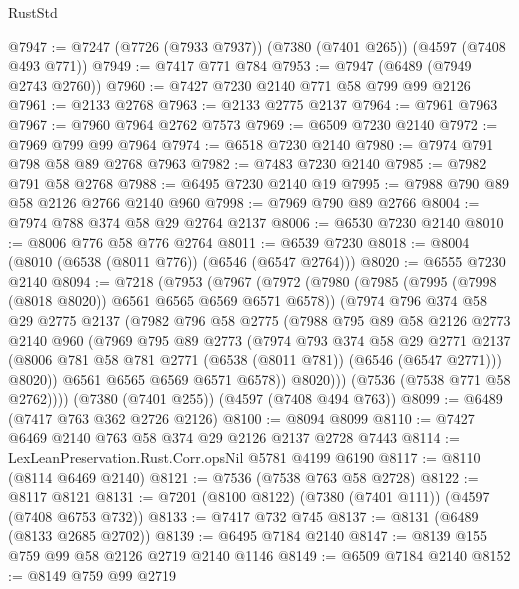 \begin{lexlean}{RustStd}
\begin{coremodule}
@7947 := @7247 (@7726 (@7933 @7937)) (@7380 (@7401 @265)) (@4597 (@7408 @493 @771))
@7949 := @7417 @771 @784
@7953 := @7947 (@6489 (@7949 @2743 @2760))
@7960 := @7427 @7230 @2140 @771 @58 @799 @99 @2126
@7961 := @2133 @2768
@7963 := @2133 @2775 @2137
@7964 := @7961 @7963
@7967 := @7960 @7964 @2762 @7573
@7969 := @6509 @7230 @2140
@7972 := @7969 @799 @99 @7964
@7974 := @6518 @7230 @2140
@7980 := @7974 @791 @798 @58 @89 @2768 @7963
@7982 := @7483 @7230 @2140
@7985 := @7982 @791 @58 @2768
@7988 := @6495 @7230 @2140 @19
@7995 := @7988 @790 @89 @58 @2126 @2766 @2140 @960
@7998 := @7969 @790 @89 @2766
@8004 := @7974 @788 @374 @58 @29 @2764 @2137
@8006 := @6530 @7230 @2140
@8010 := @8006 @776 @58 @776 @2764
@8011 := @6539 @7230
@8018 := @8004 (@8010 (@6538 (@8011 @776)) (@6546 (@6547 @2764)))
@8020 := @6555 @7230 @2140
@8094 := @7218
    (@7953
      (@7967
        (@7972
          (@7980
            (@7985 (@7995 (@7998 (@8018 @8020)) @6561 @6565 @6569 @6571 @6578))
            (@7974
              @796
              @374
              @58
              @29
              @2775
              @2137
              (@7982
                @796
                @58
                @2775
                (@7988
                  @795
                  @89
                  @58
                  @2126
                  @2773
                  @2140
                  @960
                  (@7969
                    @795
                    @89
                    @2773
                    (@7974
                      @793
                      @374
                      @58
                      @29
                      @2771
                      @2137
                      (@8006 @781 @58 @781 @2771 (@6538 (@8011 @781)) (@6546 (@6547 @2771)))
                      @8020))
                  @6561
                  @6565
                  @6569
                  @6571
                  @6578))
              @8020)))
        (@7536 (@7538 @771 @58 @2762))))
    (@7380 (@7401 @255))
    (@4597 (@7408 @494 @763))
@8099 := @6489 (@7417 @763 @362 @2726 @2126)
@8100 := @8094 @8099
@8110 := @7427 @6469 @2140 @763 @58 @374 @29 @2126 @2137 @2728 @7443
@8114 := LexLeanPreservation.Rust.Corr.opsNil @5781 @4199 @6190
@8117 := @8110 (@8114 @6469 @2140)
@8121 := @7536 (@7538 @763 @58 @2728)
@8122 := @8117 @8121
@8131 := @7201 (@8100 @8122) (@7380 (@7401 @111)) (@4597 (@7408 @6753 @732))
@8133 := @7417 @732 @745
@8137 := @8131 (@6489 (@8133 @2685 @2702))
@8139 := @6495 @7184 @2140
@8147 := @8139 @155 @759 @99 @58 @2126 @2719 @2140 @1146
@8149 := @6509 @7184 @2140
@8152 := @8149 @759 @99 @2719

\end{coremodule}
\end{lexlean}
